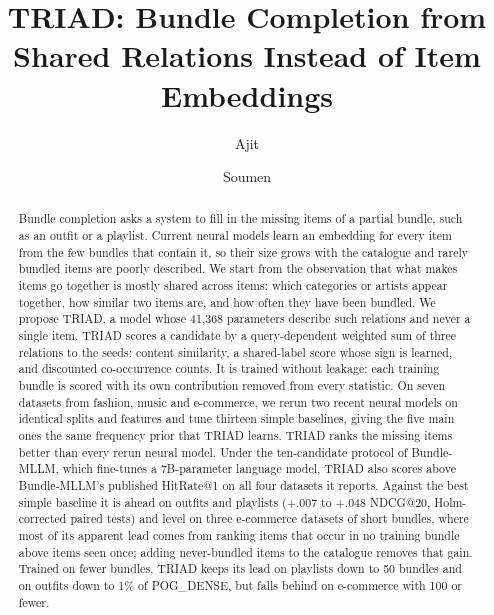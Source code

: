 \documentclass[runningheads]{llncs}
\begin{document}
\title{TRIAD: Bundle Completion from Shared Relations Instead of Item Embeddings}
\author{Ajit \and Soumen}
\institute{}  %
\maketitle

\begin{abstract}
Bundle completion asks a system to fill in the missing items of a partial bundle, such as an outfit or a playlist.
Current neural models learn an embedding for every item from the few bundles that contain it, so their size grows
with the catalogue and rarely bundled items are poorly described. We start from the observation that what makes items
go together is mostly shared across items: which categories or artists appear together, how similar two items are,
and how often they have been bundled. We propose TRIAD, a model whose 41,368 parameters describe such relations and
never a single item. TRIAD scores a candidate by a query-dependent weighted sum of three relations to the seeds:
content similarity, a shared-label score whose sign is learned, and discounted co-occurrence counts. It is trained without leakage: each training bundle is scored with its own contribution removed from every
statistic. On seven datasets from fashion, music and e-commerce, we rerun two recent neural models on identical splits
and features and tune thirteen simple baselines, giving the five main ones the same frequency prior that TRIAD
learns. TRIAD ranks the missing items better than every rerun neural model. Under the ten-candidate protocol of
Bundle-MLLM, which fine-tunes a 7B-parameter language model, TRIAD also scores above Bundle-MLLM's published
HitRate@1 on all four datasets it reports. Against the best simple baseline it is
ahead on outfits and playlists (+.007 to +.048 NDCG@20, Holm-corrected paired tests) and level on three
e-commerce datasets of short bundles, where most of its apparent lead comes from ranking items that occur in no
training bundle above items seen once; adding never-bundled items to the catalogue removes that gain. Trained on fewer bundles,
TRIAD keeps its lead on playlists down to 50 bundles and on outfits down to 1\% of POG\_DENSE, but falls behind on
e-commerce with 100 or fewer.
\end{abstract}
\end{document}
